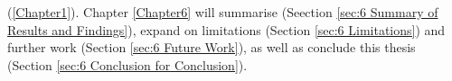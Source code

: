 (\ref{Chapter1}).  Chapter \ref{Chapter6} will summarise (Seection \ref{sec:6 Summary of Results and Findings}), expand on limitations (Section \ref{sec:6 Limitations}) and further work (Section \ref{sec:6 Future Work}), as well as conclude this thesis (Section \ref{sec:6 Conclusion for Conclusion}). 






